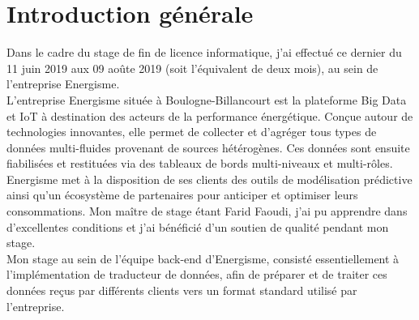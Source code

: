 \section{Introduction générale}
Dans le cadre du stage de fin de licence informatique, j'ai effectué ce dernier du 11 juin 2019 aux 09 aoûte 2019 (soit l’équivalent de deux mois), au sein de l'entreprise Energisme.\\
L'entreprise Energisme située à Boulogne-Billancourt est la plateforme Big Data et IoT à destination des acteurs de la performance énergétique. Conçue autour de technologies innovantes, elle permet de collecter et d’agréger tous types de données multi-fluides provenant de sources hétérogènes. Ces données sont ensuite fiabilisées et restituées via des tableaux de bords multi-niveaux et multi-rôles. Energisme met à la disposition de ses clients des outils de modélisation prédictive ainsi qu’un écosystème de partenaires pour anticiper et optimiser leurs consommations. Mon  maître  de  stage  étant Farid Faoudi, j’ai pu apprendre  dans d’excellentes conditions et j'ai bénéficié d’un soutien de qualité pendant mon stage.\\


Mon stage au sein de l'équipe back-end d'Energisme, consisté essentiellement à l’implémentation de traducteur de données, afin de préparer et de traiter ces données reçus par différents clients  vers un format standard utilisé par l'entreprise.
 
